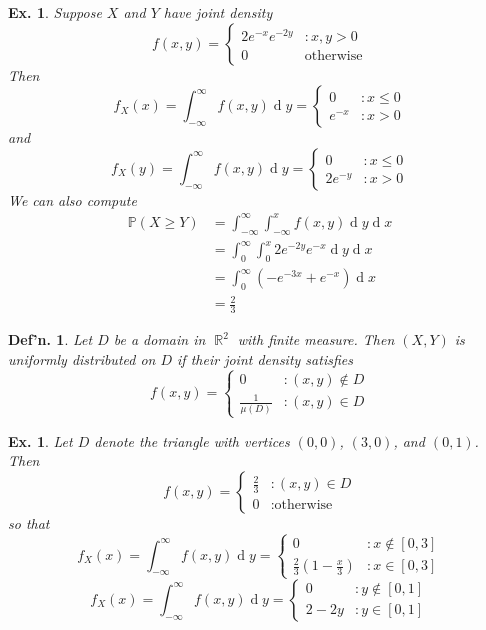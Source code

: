 \documentclass[12pt, a4paper]{book}
\DeclareMathOperator{\R}{\mathbb{R}}
\renewcommand{\Pr}{\mathbb{P}}
\renewcommand{\d}[1]{\ensuremath{\operatorname{d}\!{#1}}} %
\newtheorem{definition}[theorem]{Def'n.}
\newtheorem{example}[theorem]{Ex.}
\theoremstyle{nonumberplain}
\begin{document}
\begin{example}
    Suppose $X$ and $Y$ have joint density
    \[f(x,y)=
        \begin{cases}
            2e^{-x}e^{-2y} &: x,y>0\\
            0 & \text{otherwise}
        \end{cases}
    \]
    Then
    \[f_X(x)=\int_{-\infty}^\infty f(x,y)\d{y}=
        \begin{cases}
            0 &: x\leq 0\\
            e^{-x} &: x>0
        \end{cases}
    \]
    and
    \[f_X(y)=\int_{-\infty}^\infty f(x,y)\d{y}=
        \begin{cases}
            0 &: x\leq 0\\
            2e^{-y} &: x>0
        \end{cases}
    \]
    We can also compute
    \begin{align*}
        \Pr(X\geq Y) &= \int_{-\infty}^\infty \int_{-\infty}^x f(x,y)\d{y}\d{x}\\
                     &= \int_0^{\infty}\int_0^x 2e^{-2y}e^{-x}\d{y}\d{x}\\
                     &= \int_0^\infty (-e^{-3x}+e^{-x})\d{x}\\
                     &= \frac{2}{3}
    \end{align*}
\end{example}
\begin{definition}
    Let $D$ be a domain in $\R^2$ with finite measure.
    Then $(X,Y)$ is uniformly distributed on $D$ if their joint density satisfies
    \[f(x,y)=
        \begin{cases}
            0 &: (x,y)\notin D\\
            \frac{1}{\mu(D)} &: (x,y)\in D
        \end{cases}
    \]
\end{definition}
\begin{example}
    Let $D$ denote the triangle with vertices $(0,0)$, $(3,0)$, and $(0,1)$.
    Then
    \[f(x,y)=
        \begin{cases}
            \frac{2}{3}&: (x,y)\in D\\
            0 &:\text{otherwise}
        \end{cases}
    \]
    so that
    \[f_X(x)=\int_{-\infty}^\infty f(x,y)\d{y}=
        \begin{cases}
            0 &: x\notin[0,3]\\
            \frac{2}{3}\left(1-\frac{x}{3}\right) &: x\in[0,3]
        \end{cases}
    \]
    \[f_X(x)=\int_{-\infty}^\infty f(x,y)\d{y}=
        \begin{cases}
            0 &: y\notin[0,1]\\
            2-2y &: y\in[0,1]
        \end{cases}
    \]
\end{example}
\end{document}
